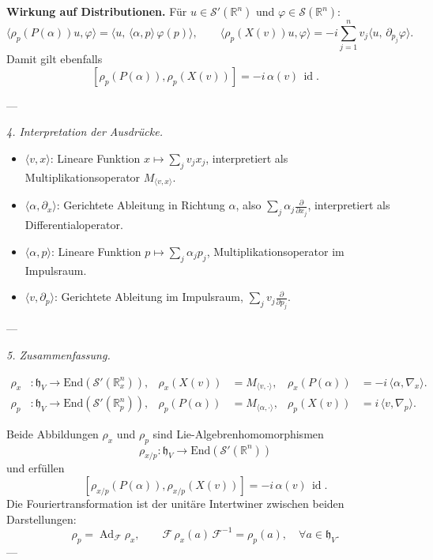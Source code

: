 \documentclass[10pt, letterpaper]{article}
\newcommand{\id}{\operatorname{id}}
\newcommand{\Ad}{\operatorname{Ad}}
\newcommand{\R}{\mathbb{R}}
\newcommand{\End}{\mathrm{End}}
\begin{document}
\textbf{Wirkung auf Distributionen.}
Für $u\in\mathcal{S}'(\R^n)$ und $\varphi\in\mathcal{S}(\R^n)$:
\[
\langle \rho_p(P(\alpha))u,\varphi\rangle
=\langle u,\,\langle \alpha,p\rangle\,\varphi(p)\rangle,
\qquad
\langle \rho_p(X(v))u,\varphi\rangle
=-i\sum_{j=1}^n v_j\langle u,\,\partial_{p_j}\varphi\rangle.
\]
Damit gilt ebenfalls
\[
[\rho_p(P(\alpha)),\rho_p(X(v))]=-i\,\alpha(v)\,\id.
\]

---

\emph{4. Interpretation der Ausdrücke.}

\begin{itemize}
\item $\langle v,x\rangle$:
Lineare Funktion $x\mapsto \sum_j v_j x_j$,
interpretiert als Multiplikationsoperator $M_{\langle v,x\rangle}$.

\item $\langle \alpha,\partial_x\rangle$:
Gerichtete Ableitung in Richtung $\alpha$, also
\(\sum_j \alpha_j \frac{\partial}{\partial x_j}\),
interpretiert als Differentialoperator.

\item $\langle \alpha,p\rangle$:
Lineare Funktion $p\mapsto \sum_j \alpha_j p_j$,
Multiplikationsoperator im Impulsraum.

\item $\langle v,\partial_p\rangle$:
Gerichtete Ableitung im Impulsraum,
\(\sum_j v_j \frac{\partial}{\partial p_j}\).
\end{itemize}

---

\emph{5. Zusammenfassung.}

\[
\boxed{
\begin{aligned}
\rho_x &: \mathfrak{h}_V \to \End(\mathcal{S}'(\R^n_x)),&
\rho_x(X(v)) &= M_{\langle v,\cdot\rangle},&
\rho_x(P(\alpha)) &= -i\,\langle \alpha,\nabla_x\rangle.\\[4pt]
\rho_p &: \mathfrak{h}_V \to \End(\mathcal{S}'(\R^n_p)),&
\rho_p(P(\alpha)) &= M_{\langle \alpha,\cdot\rangle},&
\rho_p(X(v)) &= i\,\langle v,\nabla_p\rangle.
\end{aligned}
}
\]

Beide Abbildungen $\rho_x$ und $\rho_p$ sind Lie-Algebrenhomomorphismen
\[
\rho_{x/p} : \mathfrak{h}_V \longrightarrow \End(\mathcal{S}'(\R^n))
\]
und erfüllen
\[
[\rho_{x/p}(P(\alpha)),\rho_{x/p}(X(v))]=-i\,\alpha(v)\,\id.
\]
Die Fouriertransformation ist der unitäre Intertwiner zwischen beiden Darstellungen:
\[
\rho_p = \Ad_{\mathcal{F}}\rho_x,\qquad
\mathcal{F}\,\rho_x(a)\,\mathcal{F}^{-1}=\rho_p(a),\quad\forall a\in\mathfrak{h}_V.
\]
---
\end{document}
